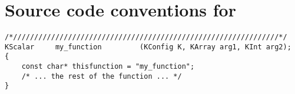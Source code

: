 % 

\chapter{Source code conventions for \K}

\begin{lstlisting}[aboveskip=\bigskipamount,caption={\K\ function template},label=K:sourcecode:functiontemplate]
/*///////////////////////////////////////////////////////////////*/
KScalar     my_function         (KConfig K, KArray arg1, KInt arg2);
{
    const char* thisfunction = "my_function";
    /* ... the rest of the function ... */
}
\end{lstlisting}

